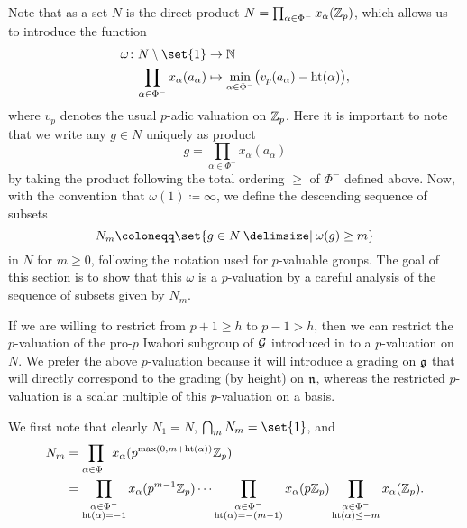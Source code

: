 Note that as a set $N$ is the direct product $N = \prod_{\alpha \in \Phi^{-}} x_\alpha(\mathbb{Z}_p)$, which allows us to introduce the function
\begin{equation}\label{eq:p-val}
  \begin{split}
    \omega \colon N \setminus \set{1} &\to \N \\
    \prod_{\alpha \in \Phi^{-}} x_\alpha(a_\alpha) &\mapsto \min_{\alpha \in \Phi^{-}} \bigl( v_p(a_\alpha) - \Ht(\alpha) \bigr),
  \end{split}
\end{equation}
where $v_p$ denotes the usual $p$-adic valuation on $\mathbb{Z}_p$. Here it is important to note that we write any $g \in N$ uniquely as product
\begin{equation*}
  g = \prod_{\alpha \in \Phi^{-}} x_\alpha(a_\alpha)
\end{equation*}
by taking the product following the total ordering $\geq$ of $\Phi^{-}$ defined above. Now, with the convention that $\omega(1) \coloneqq \infty$, we define the descending sequence of subsets
\begin{equation*}
  N_{m} \coloneqq \set{g \in N \given \omega(g) \geq m}
\end{equation*}
in $N$ for $m\geq0$, following the notation used for $p$-valuable groups. The goal of this section is to show that this $\omega$ is a $p$-valuation by a careful analysis of the sequence of subsets given by $N_m$.

\begin{remark}
  If we are willing to restrict from $p+1 \geq h$ to $p-1 > h$, then we can restrict the $p$-valuation of the pro-$p$ Iwahori subgroup of $\mathcal{G}$ introduced in  to a $p$-valuation on $N$. We prefer the above $p$-valuation because it will introduce a grading on $\mathfrak{g}$ that will directly correspond to the grading (by height) on $\mathfrak{n}$, whereas the restricted $p$-valuation is a scalar multiple of this $p$-valuation on a basis. 
\end{remark}

We first note that clearly $N_1 = N$, $\bigcap_m N_m = \set{1}$, and
\begin{equation}
  \label{eq:N_m}
  \begin{split}
    N_m &= \prod_{\alpha \in \Phi^{-}} x_\alpha(p^{\max(0,m+\operatorname{ht}(\alpha))} \mathbb{Z}_p) \\
    &= \prod_{\substack{\alpha\in \Phi^{-} \\ \operatorname{ht}(\alpha) = -1}} x_\alpha(p^{m-1} \mathbb{Z}_p) \dotsb \prod_{\substack{\alpha\in \Phi^{-} \\ \operatorname{ht}(\alpha) = -(m-1)}} x_\alpha(p\mathbb{Z}_p) \prod_{\substack{\alpha\in \Phi^{-} \\ \operatorname{ht}(\alpha) \leq -m}} x_\alpha(\mathbb{Z}_p).
  \end{split}
\end{equation}


